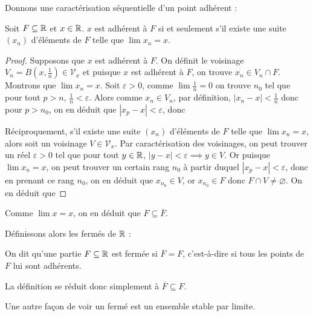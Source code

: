 Donnons une caractérisation séquentielle d'un point adhérent :

\begin{prop}
    Soit $F\subseteq \mathbb{R}$ et $x\in\mathbb{R}$. $x$ est adhérent à $F$ si et seulement s'il existe une suite $(x_n)$ d'éléments de $F$ telle que $\lim x_n = x$.
\end{prop}

\begin{proof}
    Supposons que $x$ est adhérent à $F$. On définit le voisinage $V_n = \displaystyle{B\left(x,\frac{1}{n}\right)}\in\mathcal V_x$ et puisque $x$ est adhérent à $F$, on trouve $x_n \in V_n\cap F$. Montrons que $\lim x_n = x$. Soit $\varepsilon > 0$, comme $\lim \frac{1}{n} = 0$ on trouve $n_0$ tel que pour tout $p > n$, $\frac{1}{n} < \varepsilon$. Alors comme $x_n \in V_n$, par définition, $|x_n-x| < \frac{1}{n}$ donc pour $p > n_0$, on en déduit que $|x_p - x| < \varepsilon$, donc 

    Réciproquement, s'il existe une suite $(x_n)$ d'éléments de $F$ telle que $\lim x_n = x$, alors soit un voisinage $V\in\mathcal V_x$. Par caractérisation des voisinages, on peut trouver un réel $\varepsilon > 0$ tel que pour tout $y\in\mathbb{R}$, $|y-x| < \varepsilon \implies y \in V$. Or puisque $\lim x_n = x$, on peut trouver un certain rang $n_0$ à partir duquel $|x_p - x| < \varepsilon$, donc en prenant ce rang $n_0$, on en déduit que $x_{n_0}\in V$, or $x_{n_0}\in F$ donc $F\cap V \neq \varnothing$. On en déduit que
\end{proof}

\begin{rmk}
    Comme $\lim x = x$, on en déduit que $F\subseteq \overline F$.
\end{rmk}

Définissons alors les fermés de $\mathbb{R}$ :

\begin{defi}[Fermé]
    On dit qu'une partie $F\subseteq \mathbb{R}$ est fermée si $\overline F = F$, c'est-à-dire si tous les points de $F$ lui sont adhérents.
\end{defi}

\begin{rmk}
    La définition se réduit donc simplement à $\overline F \subseteq F$.
\end{rmk}

Une autre façon de voir un fermé est un ensemble stable par limite.

